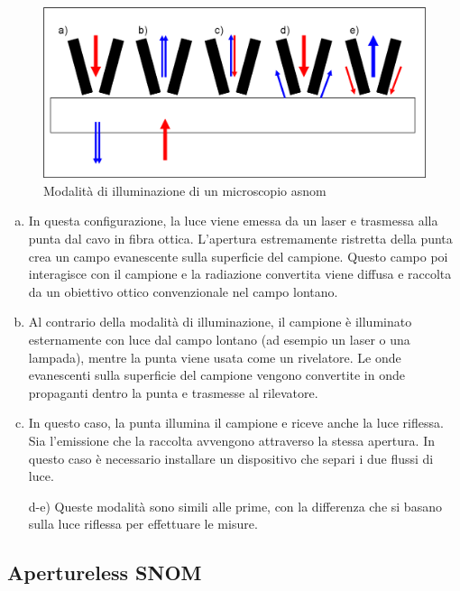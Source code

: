 \documentclass[../main.tex]{subfiles}
\begin{document}
\begin{figure}[h]
	\includegraphics[keepaspectratio, width=\linewidth]{images/snom_apertures.png}
	\caption[Modalità di illuminazione di un microscopio a-SNOM]{
		Modalità di illuminazione di un microscopio \acrshort{asnom}}
	\label{fig:snom_apertures}
\end{figure}

\begin{enumerate}[a)]
	\item In questa configurazione, la luce viene emessa da un laser e trasmessa alla punta dal cavo in fibra ottica. L'apertura estremamente ristretta della punta crea un campo evanescente sulla superficie del campione. Questo campo poi interagisce con il campione e la radiazione convertita viene diffusa e raccolta da un obiettivo ottico convenzionale nel campo lontano.
	\item Al contrario della modalità di illuminazione, il campione è illuminato esternamente con luce dal campo lontano (ad esempio un laser o una lampada), mentre la punta viene usata come un rivelatore. Le onde evanescenti sulla superficie del campione vengono convertite in onde propaganti dentro la punta e trasmesse al rilevatore.
	\item In questo caso, la punta illumina il campione e riceve anche la luce riflessa. Sia l'emissione che la raccolta avvengono attraverso la stessa apertura. In questo caso è necessario installare un dispositivo che separi i due flussi di luce.
	\item[d-e)] Queste modalità sono simili alle prime, con la differenza che si basano sulla luce riflessa per effettuare le misure.
\end{enumerate}

\subsection{Apertureless SNOM}
\end{document}
